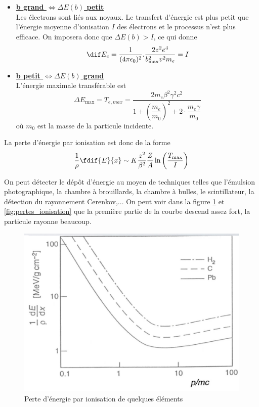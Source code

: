 \begin{itemize}[label=$\rightarrow$]
    \item \underline{\textbf{b grand $\Leftrightarrow\Delta E(b)$ petit}}\\[0,2cm]
    Les électrons sont liés aux noyaux. Le transfert d'énergie est plus petit que l'énergie moyenne d'ionisation $I$ des électrons et le processus n'est plus efficace. On imposera donc que $\Delta E(b) > I$, ce qui donne
    \[
        \dif E_e=\dfrac{1}{(4\pi \epsilon_0)^2}.\dfrac{2z^2e^4}{b_\text{max}^2v^2m_e}=I
    \]
    \item \underline{\textbf{b petit $\Longleftrightarrow\Delta E(b)$ grand}}\\[0,2cm]
    L'énergie maximale transférable est
    \[
        \Delta E_\text{max}=T_{e,max}=\dfrac{2m_e\beta^2\gamma^2c^2}{1+\left(\dfrac{m_e}{m_0}\right)^2+2\cdot\dfrac{m_e\gamma}{m_0}}
    \]
    où $m_0$ est la masse de la particule incidente.
\end{itemize}
La perte d'énergie par ionisation est donc de la forme
\[
    \dfrac{1}{\rho}\fdif{E}{x} \sim K\dfrac{z^2}{\beta^2}\dfrac{Z}{A}  \ln{\left(\dfrac{T_\text{max}}{I}\right)}
\]

On peut détecter le dépôt d'énergie au moyen de techniques telles que l'émulsion photographique, la chambre à brouillards, la chambre à bulles, le scintillateur, la détection du rayonnement Cerenkov,...
On peut voir dans la figure \ref{fig:perte_energie} et \ref{fig:pertes_ionisation} que la première partie de la courbe descend assez fort, la particule rayonne beaucoup.

\begin{figure}[ht]
    \centering
    \includegraphics[scale=0.60]{Images1/perteenergie.PNG}
    \caption{Perte d'énergie par ionisation de quelques éléments}
    \label{fig:perte_energie}
\end{figure}


